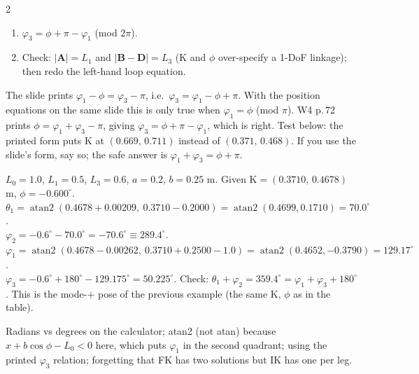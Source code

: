 \begin{multicols}{2}
\begin{recipe}
\begin{enumerate}
\item $\varphi_3=\phi+\pi-\varphi_1$ (mod $2\pi$).
\item Check: $\lvert\mathbf A\rvert=L_1$ and $\lvert\mathbf B-\mathbf D\rvert=L_3$ (K and $\phi$ over-specify a 1-DoF linkage); then redo the left-hand loop equation.
\end{enumerate}
\end{recipe}
\begin{slideerr}[W13 p.\,11, Q5 continued]
The slide prints $\varphi_1-\phi=\varphi_3-\pi$, i.e.\ $\varphi_3=\varphi_1-\phi+\pi$. With the position equations on the same slide this is only true when $\varphi_1=\phi$ (mod $\pi$). W4 p.\,72 prints $\phi=\varphi_1+\varphi_3-\pi$, giving $\varphi_3=\phi+\pi-\varphi_1$, which is right. Test below: the printed form puts K at $(0.669,\,0.711)$ instead of $(0.371,\,0.468)$. If you use the slide's form, say so; the safe answer is $\varphi_1+\varphi_3=\phi+\pi$. \chk
\end{slideerr}
\begin{worked}[W13 Q5 numbers]
$L_0=1.0$, $L_1=0.5$, $L_3=0.6$, $a=0.2$, $b=0.25$ m. Given K$=(0.3710,\,0.4678)$ m, $\phi=-0.600^\circ$.\\
$\theta_1=\operatorname{atan2}(0.4678+0.00209,\ 0.3710-0.2000)=\operatorname{atan2}(0.4699,0.1710)=70.0^\circ$.\\
$\varphi_2=-0.6^\circ-70.0^\circ=-70.6^\circ\equiv289.4^\circ$.\\
$\varphi_1=\operatorname{atan2}(0.4678-0.00262,\ 0.3710+0.2500-1.0)=\operatorname{atan2}(0.4652,-0.3790)=129.17^\circ$.\\
$\varphi_3=-0.6^\circ+180^\circ-129.175^\circ=50.225^\circ$. Check: $\theta_1+\varphi_2=359.4^\circ=\varphi_1+\varphi_3+180^\circ$. This is the mode-$+$ pose of the previous example (the same K, $\phi$ as in the table). \chk
\end{worked}
\begin{trap}
Radians vs degrees on the calculator; atan2 (not atan) because $x+b\cos\phi-L_0<0$ here, which puts $\varphi_1$ in the second quadrant; using the printed $\varphi_3$ relation; forgetting that FK has two solutions but IK has one per leg.
\end{trap}


\end{multicols}
